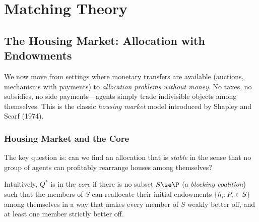 \chapter{Matching Theory}

\section{The Housing Market: Allocation with Endowments}

We now move from settings where monetary transfers are available (auctions, mechanisms with payments) to \textit{allocation problems without money}. No taxes, no subsidies, no side payments---agents simply trade indivisible objects among themselves. This is the classic \textit{housing market} model introduced by Shapley and Scarf (1974).

\subsection{Housing Market and the Core}


The key question is: can we find an allocation that is \textit{stable} in the sense that no group of agents can profitably rearrange houses among themselves?

 Intuitively, $Q^*$ is in the \textit{core} if there is no subset $S \se \P$ (a \textit{blocking coalition}) such that the members of $S$ can reallocate their initial endowments $\{h_i : P_i \in S\}$ among themselves in a way that makes every member of $S$ weakly better off, and at least one member strictly better off.

